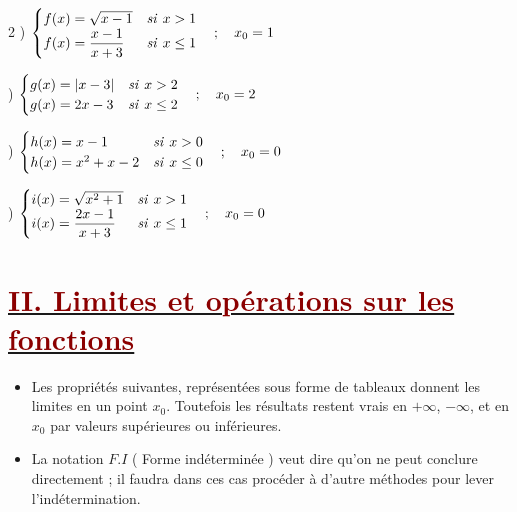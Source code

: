 \documentclass[12pt,a4paper]{article}
\begin{document}
\begin{multicols}{2}
) $\begin{cases} 
f(x) = \sqrt{x - 1} & \text{\textit{si }} x > 1 \\ 
f(x) = \dfrac{x - 1}{x + 3} & \text{\textit{si }} x \leq 1 
\end{cases} \quad ; \quad x_0 = 1$

\vspace{0.6cm}

) $\begin{cases} 
g(x) = |x - 3| & \text{\textit{si }} x > 2 \\ 
g(x) = 2x - 3 & \text{\textit{si }} x \leq 2 
\end{cases} \quad ; \quad x_0 = 2$

\columnbreak

) $\begin{cases} 
h(x) = x - 1 & \text{\textit{si }} x > 0 \\ 
h(x) = x^2 + x - 2 & \text{\textit{si }} x \leq 0 
\end{cases} \quad ; \quad x_0 = 0$

\vspace{0.6cm}

) $\begin{cases} 
i(x) = \sqrt{x^2 + 1} & \text{\textit{si }} x > 1 \\ 
i(x) = \dfrac{2x - 1}{x + 3} & \text{\textit{si }} x \leq 1 
\end{cases} \quad ; \quad x_0 = 0$
\end{multicols}

\section*{\underline{\textcolor{darkred}{ II. Limites et opérations sur les fonctions}}}
\begin{itemize}
    \item Les propriétés suivantes, représentées sous forme de tableaux donnent les limites en un point $x_0$. Toutefois les résultats restent vrais en $+\infty$, $-\infty$, et en $x_0$ par valeurs supérieures ou inférieures.
    
    \vspace{0.2cm}
    
    \item La notation $F.I$ ( Forme indéterminée ) veut dire qu'on ne peut conclure directement ; il faudra dans ces cas procéder à d'autre méthodes pour lever l'indétermination.
\end{itemize}
\end{document}
